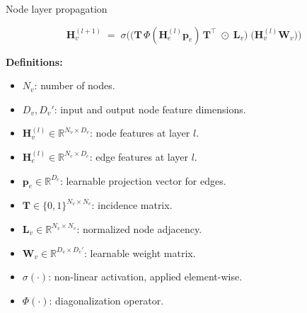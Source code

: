 \documentclass[hyperref={colorlinks,citecolor=blue,linkcolor=blue,urlcolor=blue}]{beamer}
\begin{document}
\begin{frame}{Node layer propagation}
\footnotesize

\[
\mathbf{H}_v^{(l+1)} \;=\; \sigma\Big(
\big( \mathbf{T}\,\Phi(\mathbf{H}_e^{(l)}\mathbf{p}_e)\,\mathbf{T}^\top \;\odot\; \mathbf{L}_v \big)
\; \big(\mathbf{H}_v^{(l)} \mathbf{W}_v \big)
\Big)
\]

\vspace{0.5cm}

\textbf{Definitions:}
\begin{itemize}\footnotesize
    \item \(N_v\): number of nodes.
    \item \(D_v, D_v'\): input and output node feature dimensions.
    \item \(\mathbf{H}_v^{(l)} \in \mathbb{R}^{N_v \times D_v}\): node features at layer \(l\).
    \item \(\mathbf{H}_e^{(l)} \in \mathbb{R}^{N_e \times D_e}\): edge features at layer \(l\).
    \item \(\mathbf{p}_e \in \mathbb{R}^{D_e}\): learnable projection vector for edges.
    \item \(\mathbf{T} \in \{0,1\}^{N_v \times N_e}\): incidence matrix.
    \item \(\mathbf{L}_v \in \mathbb{R}^{N_v \times N_v}\): normalized node adjacency.
    \item \(\mathbf{W}_v \in \mathbb{R}^{D_v \times D_v'}\): learnable weight matrix.
    \item \(\sigma(\cdot)\): non-linear activation, applied element-wise.
    \item \(\Phi(\cdot)\): diagonalization operator.
\end{itemize}
\end{frame}
\end{document}
